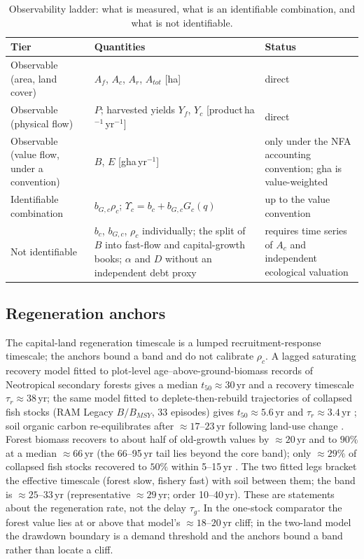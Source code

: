 \documentclass[11pt,a4paper]{article}
\newcommand{\Ups}{\Upsilon_c}
\begin{document}
\begin{table}[htbp]
\centering\small
\caption{Observability ladder: what is measured, what is an identifiable combination, and what is not identifiable.}
\label{tab:si_ladder}
\begin{tabularx}{\textwidth}{>{\raggedright\arraybackslash}p{} X >{\raggedright\arraybackslash}p{}}
\toprule
Tier & Quantities & Status \\
\midrule
Observable (area, land cover) & $A_f$, $A_c$, $A_r$, $A_{tot}$ [ha] & direct \\
Observable (physical flow) & $P$; harvested yields $Y_f$, $Y_c$ [product\,ha$^{-1}$\,yr$^{-1}$] & direct \\
Observable (value flow, under a convention) & $B$, $E$ [gha\,yr$^{-1}$] & only under the NFA accounting convention; gha is value-weighted \\
Identifiable combination & $b_{G,c}\rho_c$; $\Ups=b_c+b_{G,c}G_c(q)$ & up to the value convention \\
Not identifiable & $b_c$, $b_{G,c}$, $\rho_c$ individually; the split of $B$ into fast-flow and capital-growth books; $\alpha$ and $D$ without an independent debt proxy & requires time series of $A_c$ and independent ecological valuation \\
\bottomrule
\end{tabularx}
\end{table}

\subsection{Regeneration anchors}\label{si:anchors}

The capital-land regeneration timescale is a lumped recruitment-response timescale; the anchors bound a band and do not calibrate $\rho_c$. A lagged saturating recovery model fitted to plot-level age--above-ground-biomass records of Neotropical secondary forests \citep[2ndFOR;][1{,}334 plots, 41 chronosequences, 35 good fits]{Poorter2016} gives a median $t_{50}\approx30$\,yr and a recovery timescale $\tau_r\approx38$\,yr; the same model fitted to deplete-then-rebuild trajectories of collapsed fish stocks (RAM Legacy $B/B_{MSY}$, 33 episodes) gives $t_{50}\approx5.6$\,yr and $\tau_r\approx3.4$\,yr \citep[cf.][]{HutchingsReynolds2004,Neubauer2013}; soil organic carbon re-equilibrates after $\approx17$--$23$\,yr following land-use change \citep{Poeplau2011}. Forest biomass recovers to about half of old-growth values by $\approx20$\,yr and to $90\%$ at a median $\approx66$\,yr \citep{Poorter2016} (the 66--95\,yr tail lies beyond the core band); only $\approx29\%$ of collapsed fish stocks recovered to $50\%$ within 5--15\,yr \citep{HutchingsReynolds2004}. The two fitted legs bracket the effective timescale (forest slow, fishery fast) with soil between them; the band is $\approx25$--$33$\,yr (representative $\approx29$\,yr; order 10--40\,yr). These are statements about the regeneration rate, not the delay $\tau_g$. In the one-stock comparator the forest value lies at or above that model's $\approx18$--$20$\,yr cliff; in the two-land model the drawdown boundary is a demand threshold and the anchors bound a band rather than locate a cliff.
\end{document}

